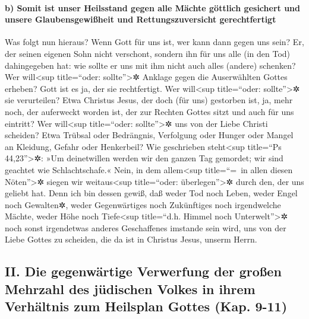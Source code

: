 \hypertarget{b-somit-ist-unser-heilsstand-gegen-alle-muxe4chte-guxf6ttlich-gesichert-und-unsere-glaubensgewiuxdfheit-und-rettungszuversicht-gerechtfertigt}{%
\paragraph{b) Somit ist unser Heilsstand gegen alle Mächte göttlich
gesichert und unsere Glaubensgewißheit und Rettungszuversicht
gerechtfertigt}\label{b-somit-ist-unser-heilsstand-gegen-alle-muxe4chte-guxf6ttlich-gesichert-und-unsere-glaubensgewiuxdfheit-und-rettungszuversicht-gerechtfertigt}}

 Was folgt nun hieraus? Wenn Gott für uns ist, wer kann
dann gegen uns sein?  Er, der seinen eigenen Sohn nicht
verschont, sondern ihn für uns alle (in den Tod) dahingegeben hat: wie
sollte er uns mit ihm nicht auch alles (andere) schenken?
 Wer will\textless sup title=``oder:
sollte''\textgreater✲ Anklage gegen die Auserwählten Gottes erheben?
Gott ist es ja, der sie rechtfertigt.  Wer
will\textless sup title=``oder: sollte''\textgreater✲ sie verurteilen?
Etwa Christus Jesus, der doch (für uns) gestorben ist, ja, mehr noch,
der auferweckt worden ist, der zur Rechten Gottes sitzt und auch für uns
eintritt?  Wer will\textless sup title=``oder:
sollte''\textgreater✲ uns von der Liebe Christi scheiden? Etwa Trübsal
oder Bedrängnis, Verfolgung oder Hunger oder Mangel an Kleidung, Gefahr
oder Henkerbeil?  Wie geschrieben steht\textless sup
title=``Ps 44,23''\textgreater✲: »Um deinetwillen werden wir den ganzen
Tag gemordet; wir sind geachtet wie Schlachtschafe.« 
Nein, in dem allem\textless sup title=``=~in allen diesen
Nöten''\textgreater✲ siegen wir weitaus\textless sup title=``oder:
überlegen''\textgreater✲ durch den, der uns geliebt hat. 
Denn ich bin dessen gewiß, daß weder Tod noch Leben, weder Engel noch
Gewalten✲, weder Gegenwärtiges noch Zukünftiges noch irgendwelche
Mächte,  weder Höhe noch Tiefe\textless sup title=``d.h.
Himmel noch Unterwelt''\textgreater✲ noch sonst irgendetwas anderes
Geschaffenes imstande sein wird, uns von der Liebe Gottes zu scheiden,
die da ist in Christus Jesus, unserm Herrn.

\hypertarget{ii.-die-gegenwuxe4rtige-verwerfung-der-grouxdfen-mehrzahl-des-juxfcdischen-volkes-in-ihrem-verhuxe4ltnis-zum-heilsplan-gottes-kap.-9-11}{%
\subsection{II. Die gegenwärtige Verwerfung der großen Mehrzahl des
jüdischen Volkes in ihrem Verhältnis zum Heilsplan Gottes (Kap.
9-11)}\label{ii.-die-gegenwuxe4rtige-verwerfung-der-grouxdfen-mehrzahl-des-juxfcdischen-volkes-in-ihrem-verhuxe4ltnis-zum-heilsplan-gottes-kap.-9-11}}

